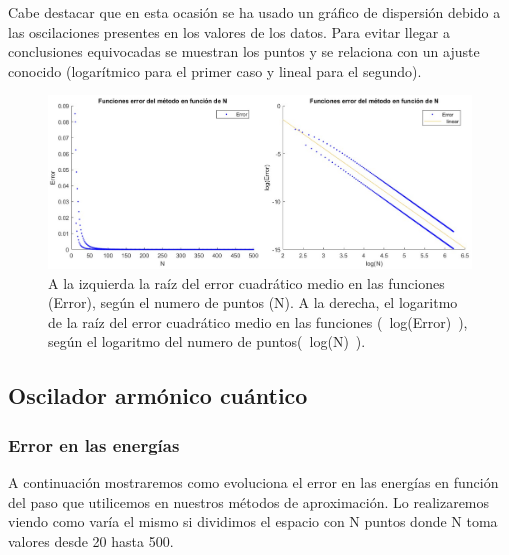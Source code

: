 \documentclass[12pt]{article}
\begin{document}
    Cabe destacar que en esta ocasión se ha usado un gráfico de dispersión debido a las oscilaciones presentes en los valores de los datos. Para evitar llegar a conclusiones equivocadas se muestran los puntos y se relaciona con un ajuste conocido (logarítmico para el primer caso y lineal para el segundo).
    
   \begin{figure}[H]
    \centering
    \begin{adjustbox}{width=1.2\linewidth,center}
        \includegraphics{fotos/comperror_funciones_infinito.png}
    \end{adjustbox}
    \caption{A la izquierda la raíz del error cuadrático medio en las funciones (Error), según el numero de puntos (N). A la derecha, el logaritmo de la raíz del error cuadrático medio en las funciones (~log(Error)~), según el logaritmo del numero de puntos(~log(N)~).}
\end{figure}
    
    \subsection{Oscilador armónico cuántico}

    \subsubsection{Error en las energías}

    A continuación mostraremos como evoluciona el error en las energías en función del paso que utilicemos en nuestros métodos de aproximación. Lo realizaremos viendo como varía el mismo si dividimos el espacio con N puntos donde N toma valores desde 20 hasta 500.
\end{document}
